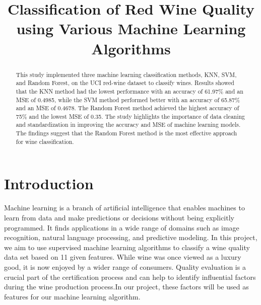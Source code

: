 \documentclass[conference]{IEEEtran}
\begin{document}
\title{Classification of Red Wine Quality using Various Machine Learning Algorithms}

\author{
\and
{}
\and
{}
}

\maketitle
\begin{abstract}
	This study implemented three machine learning classification methods, KNN, SVM, and Random Forest, on the UCI red-wine dataset to classify wines. Results showed that the KNN method had the lowest performance with an accuracy of 61.97$\%$ and an MSE of 0.4985, while the SVM method performed better with an accuracy of 65.87$\%$ and an MSE of 0.4678. The Random Forest method achieved the highest accuracy of 75$\%$ and the lowest MSE of 0.35. The study highlights the importance of data cleaning and standardization in improving the accuracy and MSE of machine learning models. The findings suggest that the Random Forest method is the most effective approach for wine classification.
\end{abstract}
\section{Introduction}
Machine learning is a branch of artificial intelligence that enables machines to learn from data and make predictions or decisions without being explicitly programmed. It finds applications in a wide range of domains such as image recognition, natural language processing, and predictive modeling. In this project, we aim to use supervised machine learning algorithms to classify a wine quality data set based on 11 given features. While wine was once viewed as a luxury good, it is now enjoyed by a wider range of consumers. Quality evaluation is a crucial part of the certification process and can help to identify influential factors during the wine production process.\cite{b1}In our project, these factors will be used as features for our machine learning algorithm.
\end{document}
